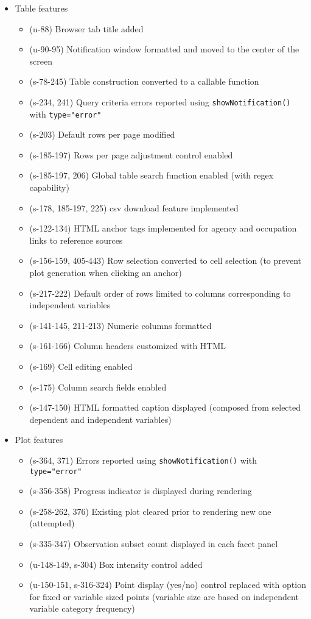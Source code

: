 \documentclass[10pt, letterpaper]{article}
\begin{document}
\begin{spacing}{1.0}
\begin{itemize}
    \item Table features
    \begin{itemize}
        \item (u-88) Browser tab title added
        \item (u-90-95) Notification window formatted and moved to the center of the screen
        \item (s-78-245) Table construction converted to a callable function
        \item (s-234, 241) Query criteria errors reported using \texttt{showNotification()} with \texttt{type="error"} 
        \item (s-203) Default rows per page modified
        \item (s-185-197) Rows per page adjustment control enabled
        \item (s-185-197, 206) Global table search function enabled (with regex capability)
        \item (s-178, 185-197, 225) csv download feature implemented
        \item (s-122-134) HTML anchor tags implemented for agency and occupation links to reference sources
        \item (s-156-159, 405-443) Row selection converted to cell selection (to prevent plot generation when clicking an anchor)
        \item (s-217-222) Default order of rows limited to columns corresponding to independent variables
        \item (s-141-145, 211-213) Numeric columns formatted
        \item (s-161-166) Column headers customized with HTML
        \item (s-169) Cell editing enabled
        \item (s-175) Column search fields enabled
        \item (s-147-150) HTML formatted caption displayed (composed from selected dependent and independent variables)
    \end{itemize}
    \item Plot features
    \begin{itemize}
        \item (s-364, 371) Errors reported using \texttt{showNotification()} with \texttt{type="error"}
        \item (s-356-358) Progress indicator is displayed during rendering
        \item (s-258-262, 376) Existing plot cleared prior to rendering new one (attempted)
        \item (s-335-347) Observation subset count displayed in each facet panel
        \item (u-148-149, s-304) Box intensity control added
        \item (u-150-151, s-316-324) Point display (yes/no) control replaced with option for fixed or variable sized points (variable size are based on independent variable category frequency)
    \end{itemize}
\end{itemize}



\end{spacing}
\end{document}
